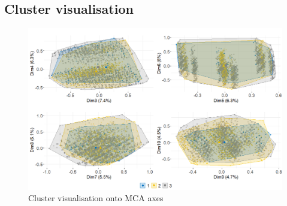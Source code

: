 \documentclass[
]{book}
\begin{document}
\hypertarget{cluster-visualisation-1}{%
\subsection*{Cluster visualisation}\label{cluster-visualisation-1}}

\begin{figure}

{\centering \includegraphics[width=2\linewidth]{./imgs/cluster_plots} 

}

\caption{Cluster visualisation onto MCA axes}\label{fig:clusterplots}
\end{figure}

  
\end{document}
